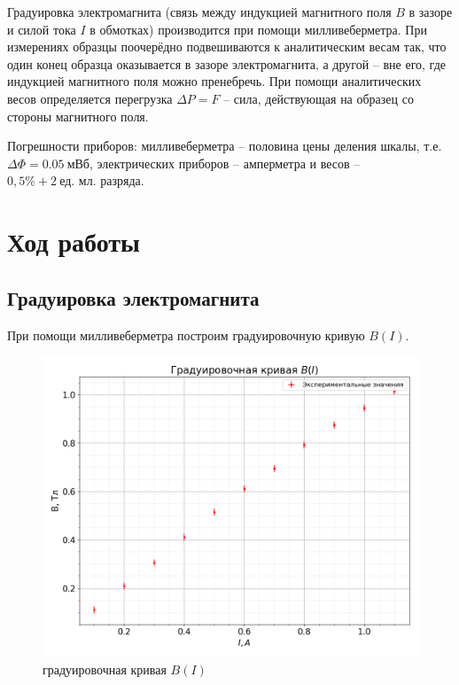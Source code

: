 \documentclass[a4paper, 12pt]{article}
\begin{document}
        Градуировка электромагнита (связь между индукцией магнитного поля $B$ в зазоре и силой тока $I$ в обмотках) производится при помощи милливеберметра. При измерениях образцы поочерёдно подвешиваются к аналитическим весам так, что один конец образца оказывается в зазоре электромагнита, а другой -- вне его, где индукцией магнитного поля можно пренебречь. При помощи аналитических весов определяется перегрузка $\Delta P=F$ -- сила, действующая на образец со стороны магнитного поля.

        Погрешности приборов: милливеберметра -- половина цены деления шкалы, т.е. $\Delta\Phi=0.05~\text{мВб}$, электрических приборов -- амперметра и весов -- $0,5\%+2~\text{ед. мл. разряда}$.

    \section{Ход работы}

        \subsection{Градуировка электромагнита}

            При помощи милливеберметра построим градуировочную кривую $B(I)$.

            \begin{figure}[h]
                \centering
                \includegraphics[scale=0.5]{img/grad.png}
                \caption{градуировочная кривая $B(I)$} \label{img:grad}
            \end{figure}
\end{document}
